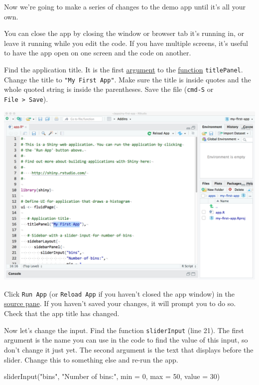 \documentclass[
]{book}
\newenvironment{Shaded}{\begin{snugshade}}{\end{snugshade}}
\newcommand{\AttributeTok}[1]{\textcolor[rgb]{0.77,0.63,0.00}{#1}}
\newcommand{\DecValTok}[1]{\textcolor[rgb]{0.00,0.00,0.81}{#1}}
\newcommand{\FunctionTok}[1]{\textcolor[rgb]{0.00,0.00,0.00}{#1}}
\newcommand{\NormalTok}[1]{#1}
\newcommand{\StringTok}[1]{\textcolor[rgb]{0.31,0.60,0.02}{#1}}
\begin{document}
Now we're going to make a series of changes to the demo app until it's all your own.

You can close the app by closing the window or browser tab it's running in, or leave it running while you edit the code. If you have multiple screens, it's useful to have the app open on one screen and the code on another.

Find the application title. It is the first \href{defs.html\#argument}{argument} to the \href{defs.html\#function}{function} \texttt{titlePanel}. Change the title to \texttt{"My\ First\ App"}. Make sure the title is inside quotes and the whole quoted string is inside the parentheses. Save the file (\texttt{cmd-S} or \texttt{File\ \textgreater{}\ Save}).

\includegraphics{images/demo_app/06-change-title.png}

Click \texttt{Run\ App} (or \texttt{Reload\ App} if you haven't closed the app window) in the \href{defs.html\#panes}{source pane}. If you haven't saved your changes, it will prompt you to do so. Check that the app title has changed.

Now let's change the input. Find the function \texttt{sliderInput} (line 21). The first argument is the name you can use in the code to find the value of this input, so don't change it just yet. The second argument is the text that displays before the slider. Change this to something else and re-run the app.

\begin{Shaded}
\begin{Highlighting}[]
         \FunctionTok{sliderInput}\NormalTok{(}\StringTok{"bins"}\NormalTok{,}
                     \StringTok{"Number of bins:"}\NormalTok{,}
                     \AttributeTok{min =} \DecValTok{0}\NormalTok{,}
                     \AttributeTok{max =} \DecValTok{50}\NormalTok{,}
                     \AttributeTok{value =} \DecValTok{30}\NormalTok{)}
\end{Highlighting}
\end{Shaded}
\end{document}
